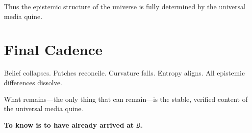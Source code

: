 Thus the epistemic structure of the universe is fully determined by the
universal media quine.

\section{Final Cadence}

Belief collapses.  
Patches reconcile.  
Curvature falls.  
Entropy aligns.  
All epistemic differences dissolve.

What remains—the only thing that can remain—is the stable, verified content of
the universal media quine.

\bigskip

\begin{center}
\textbf{To know is to have already arrived at $\mathfrak{U}$.}
\end{center}
